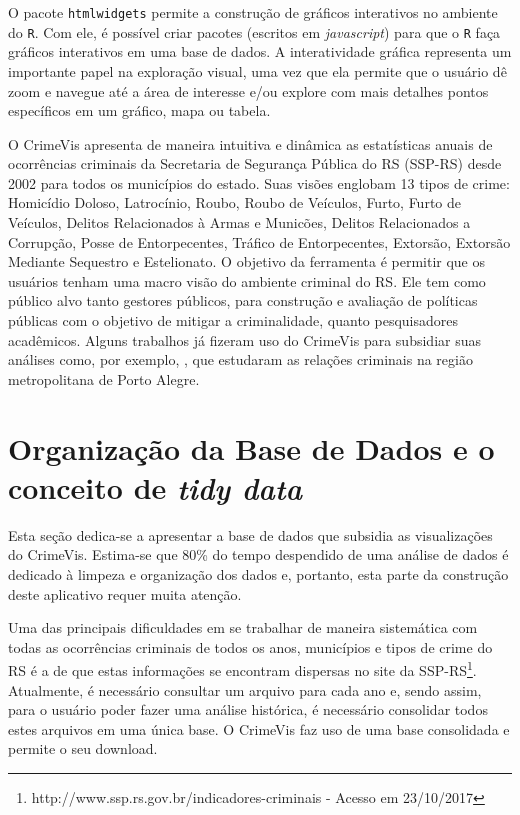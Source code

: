 \documentclass[12pt,openright,oneside,a4paper,english,french,spanish]{abntex2}
\numberwithin{table}{section} %
\numberwithin{figure}{section} %
\newcommand{\co}{\citeonline}
\begin{document}
O pacote \texttt{htmlwidgets} \cite{htmlwidgets} permite a construção de gráficos interativos no ambiente do \texttt{R}. Com ele, é possível criar pacotes (escritos em \textit{javascript}) para que o \texttt{R} faça gráficos interativos em uma base de dados. A interatividade gráfica representa um importante papel na exploração visual, uma vez que ela permite que o usuário dê zoom e navegue até a área de interesse e/ou explore com mais detalhes pontos específicos em um gráfico, mapa ou tabela.

O CrimeVis apresenta de maneira intuitiva e dinâmica as estatísticas anuais de ocorrências criminais da Secretaria de Segurança Pública do RS (SSP-RS) desde 2002 para todos os municípios do estado. Suas visões englobam 13 tipos de crime: Homicídio Doloso, Latrocínio, Roubo, Roubo de Veículos, Furto, Furto de Veículos, Delitos Relacionados à Armas e Municões, Delitos Relacionados a Corrupção, Posse de Entorpecentes, Tráfico de Entorpecentes, Extorsão, Extorsão Mediante Sequestro e Estelionato. O objetivo da ferramenta é permitir que os usuários tenham uma macro visão do ambiente criminal do RS. Ele tem como público alvo tanto gestores públicos, para construção e avaliação de políticas públicas com o objetivo de mitigar a criminalidade, quanto pesquisadores acadêmicos. Alguns trabalhos já fizeram uso do CrimeVis para subsidiar suas análises como, por exemplo, \co{menezes2017relaccoes}, que estudaram as relações criminais na região metropolitana de Porto Alegre.

\section{Organização da Base de Dados e o conceito de \textit{tidy data}\label{sec:base_tidy_crimevis}}

Esta seção dedica-se a apresentar a base de dados que subsidia as visualizações do CrimeVis. Estima-se que 80\% do tempo despendido de uma análise de dados é dedicado à limpeza e organização dos dados \cite{dasu2003exploratory} e, portanto, esta parte da construção deste aplicativo requer muita atenção.

Uma das principais dificuldades em se trabalhar de maneira sistemática com todas as ocorrências criminais de todos os anos, municípios e tipos de crime do RS é a de que estas informações se encontram dispersas no site da SSP-RS\footnote{http://www.ssp.rs.gov.br/indicadores-criminais - Acesso em 23/10/2017}. Atualmente, é necessário consultar um arquivo para cada ano e, sendo assim, para o usuário poder fazer uma análise histórica, é necessário consolidar todos estes arquivos em uma única base. O CrimeVis faz uso de uma base consolidada e permite o seu download.%
\end{document}
